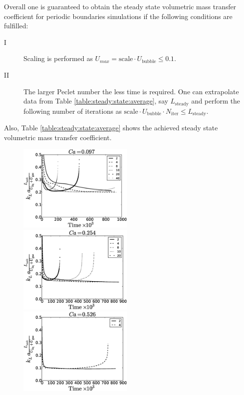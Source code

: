 \documentclass{article}
\newcommand{\ububble}{U_{\mathrm{bubble}}}
\begin{document}
Overall one is guaranteed to obtain the steady state volumetric mass transfer coefficient for
periodic boundaries simulations if the following conditions are fulfilled:
\begin{description}
\item[I] Scaling is performed as $U_{max}=\mathrm{scale}\cdot\ububble\leq 0.1$.
\item[II] The larger Peclet number the less time is required. One can extrapolate data from Table
\ref{table:steady:state:average}, say $L_{\mathrm{steady}}$ and perform the following number of
iterations as $\mathrm{scale}\cdot \ububble\cdot N_{\mathrm{iter}}\leq L_{\mathrm{steady}}$. 
\end{description}
Also, Table \ref{table:steady:state:average} shows
the achieved steady state volumetric mass transfer coefficient. 
\begin{figure}[htb!]
\includegraphics[width=0.5\textwidth]{Figures/aver_conc_scale_ca_time097.eps}
\includegraphics[width=0.5\textwidth]{Figures/aver_conc_scale_ca_time054.eps}\\
\includegraphics[width=0.5\textwidth]{Figures/aver_conc_scale_ca_time026.eps}

\end{figure}
\end{document}
